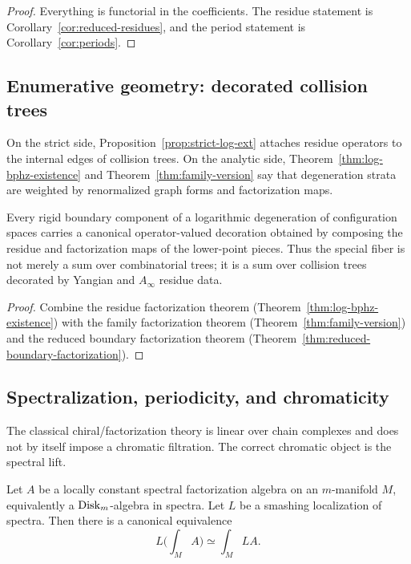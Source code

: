 \begin{proof}
Everything is functorial in the coefficients. The residue statement is Corollary~\ref{cor:reduced-residues}, and the period statement is Corollary~\ref{cor:periods}.
\end{proof}

\subsection{Enumerative geometry: decorated collision trees}
On the strict side, Proposition~\ref{prop:strict-log-ext} attaches residue operators to the internal edges of collision trees. On the analytic side, Theorem~\ref{thm:log-bphz-existence} and Theorem~\ref{thm:family-version} say that degeneration strata are weighted by renormalized graph forms and factorization maps.

\begin{proposition}\label{prop:decorated-degeneration}
Every rigid boundary component of a logarithmic degeneration of configuration spaces carries a canonical operator-valued decoration obtained by composing the residue and factorization maps of the lower-point pieces. Thus the special fiber is not merely a sum over combinatorial trees; it is a sum over collision trees decorated by Yangian and $A_\infty$ residue data.
\end{proposition}

\begin{proof}
Combine the residue factorization theorem (Theorem~\ref{thm:log-bphz-existence}) with the family factorization theorem (Theorem~\ref{thm:family-version}) and the reduced boundary factorization theorem (Theorem~\ref{thm:reduced-boundary-factorization}).
\end{proof}

\subsection{Spectralization, periodicity, and chromaticity}
The classical chiral/factorization theory is linear over chain complexes and does not by itself impose a chromatic filtration. The correct chromatic object is the spectral lift.

\begin{theorem}\label{thm:smashing-localization}
Let $A$ be a locally constant spectral factorization algebra on an $m$-manifold $M$, equivalently a $\mathrm{Disk}_m$-algebra in spectra. Let $L$ be a smashing localization of spectra. Then there is a canonical equivalence
\[
 L\Big(\int_M A\Big) \simeq \int_M LA.
\]
\end{theorem}

